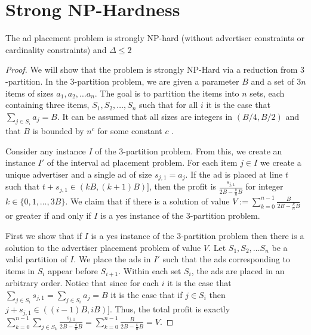 


\section{Strong NP-Hardness}
\label{sec:hardness}


\begin{theorem}
The ad placement problem is strongly NP-hard  (without advertiser constraints or cardinality constraints) and $\Delta \leq 2$
\end{theorem}

\begin{proof}

We will show that the problem is strongly NP-Hard via a reduction from $3$-partition.  In the $3$-partition problem, we are given a parameter $B$ and a set of $3n$ items of sizes $a_1, a_2, \ldots a_n$.  The goal is to partition the items into $n$ sets, each containing three items, $S_1, S_2, \ldots, S_n$ such that for all $i$ it is the case that $\sum_{j \in S_i} a_j = B$.  It can be assumed that all sizes are integers in $(B/4,B/2)$ and that $B$ is bounded by $n^{c}$ for some constant $c$ \cite{XXX}.  

Consider any instance $I$ of the $3$-partition problem.  From this, we create an instance $I'$ of the interval ad placement problem.  For each item $j \in I$ we create a unique advertiser and a single ad of size $s_{j,1} = a_j$.    If the ad is placed at line $t$ such that $t+s_{j,1} \in (kB, (k+1)B)]$, then the profit is $\frac{s_{j,1}}{2B-\frac{k}{n}B }$ for integer $k \in \{0,1,\ldots, 3B\}$.    We claim that if there is a solution of value $V := \sum_{k=0}^{n-1} \frac{B}{2B-\frac{k}{n}B}$ or greater if and only if  $I$ is a yes instance of the $3$-partition problem.  

First we show that if $I$ is a yes instance of the $3$-partition problem then there is a solution to the advertiser placement problem of value $V$.  Let $S_1, S_2, \ldots S_n$ be a valid partition of $I$.  We place the ads in $I'$ such that the ads corresponding to items in $S_i$ appear before $S_{i+1}$.  Within each set $S_i$, the ads are placed in an arbitrary order.   Notice that since for each $i$ it is the case that $\sum_{j \in S_i} s_{j,1} = \sum_{j \in S_i} a_{j} =B$  it is the case that if $j \in S_i$ then $j +s_{j,1}  \in ((i-1)B, iB)]$.  Thus, the total profit is exactly $\sum_{k=0}^{n-1}\sum_{j \in S_k} \frac{s_{j,1}}{2B-\frac{k}{n}B} =\sum_{k=0}^{n-1} \frac{B}{2B-\frac{k}{n}B} = V$.


\end{proof}
